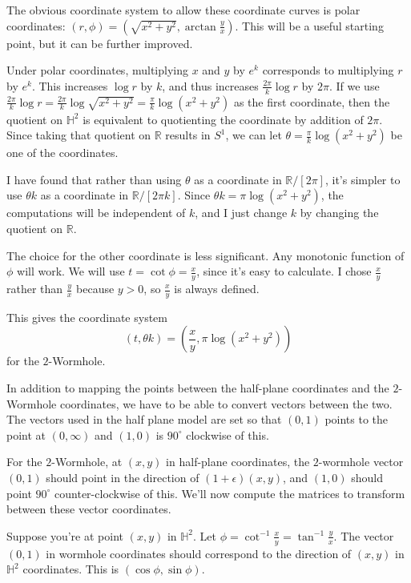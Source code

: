 The obvious coordinate system to allow these coordinate curves is polar coordinates: $(r,\phi) = \left(\sqrt{x^2+y^2},\arctan\frac{y}{x}\right)$. This will be a useful starting point, but it can be further improved.

Under polar coordinates, multiplying $x$ and $y$ by $e^k$ corresponds to multiplying $r$ by $e^k$. This increases $\log r$ by $k$, and thus increases $\frac{2\pi}{k}\log r$ by $2\pi$. If we use $\frac{2\pi}{k}\log r = \frac{2\pi}{k}\log\sqrt{x^2+y^2} = \frac{\pi}{k}\log(x^2+y^2)$ as the first coordinate, then the quotient on $\mathbb{H}^2$ is equivalent to quotienting the coordinate by addition of $2\pi$. Since taking that quotient on $\mathbb{R}$ results in $S^1$, we can let $\theta = \frac{\pi}{k}\log(x^2+y^2)$ be one of the coordinates.

I have found that rather than using $\theta$ as a coordinate in $\mathbb{R}/[2\pi]$, it's simpler to use $\theta k$ as a coordinate in $\mathbb{R}/[2\pi k]$. Since $\theta k = \pi\log(x^2+y^2)$, the computations will be independent of $k$, and I just change $k$ by changing the quotient on $\mathbb{R}$.

The choice for the other coordinate is less significant. Any monotonic function of $\phi$ will work. We will use $t = \cot\phi = \frac{x}{y}$, since it's easy to calculate. I chose $\frac{x}{y}$ rather than $\frac{y}{x}$ because $y > 0$, so $\frac{x}{y}$ is always defined.

This gives the coordinate system $$(t,\theta k) = \left(\frac{x}{y},\pi\log(x^2+y^2)\right)$$ for the $2$-Wormhole.


In addition to mapping the points between the half-plane coordinates and the $2$-Wormhole coordinates, we have to be able to convert vectors between the two. The vectors used in the half plane model are set so that $(0,1)$ points to the point at $(0,\infty)$ and $(1,0)$ is $90^\circ$ clockwise of this.

For the $2$-Wormhole, at $(x,y)$ in half-plane coordinates, the $2$-wormhole vector $(0,1)$ should point in the direction of $(1+\epsilon)(x,y)$, and $(1,0)$ should point $90^\circ$ counter-clockwise of this. We'll now compute the matrices to transform between these vector coordinates.

Suppose you're at point $(x,y)$ in $\mathbb{H}^2$. Let $\phi = \cot^{-1}\frac{x}{y} = \tan^{-1}\frac{y}{x}$. The vector $(0,1)$ in wormhole coordinates should correspond to the direction of $(x,y)$ in $\mathbb{H}^2$ coordinates. This is $(\cos\phi,\sin\phi)$.

